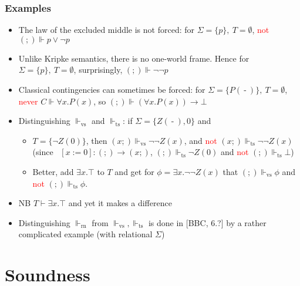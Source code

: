 \documentclass[handout,11pt]{beamer}
\newcommand{\red}[1]{\textcolor{red}{#1}}
\newcommand{\set}[1]{\{#1\}}
\newcommand{\es}{\emptyset}
\newcommand*{\subvs}{_{\mathrm{vs}}}
\newcommand*{\subrn}{_{\mathrm{rn}}}
\newcommand*{\subts}{_{\mathrm{ts}}}
\newcommand{\Fts}{\Vdash\subts}
\newcommand{\Fvs}{\Vdash\subvs}
\newcommand{\Frn}{\Vdash\subrn}
\newcommand{\blank}{\mathord{\operatorname{-}}} %
\begin{document}
\begin{frame}
\frametitle{Examples}
 \begin{itemize}[<+->]
    \item The law of the excluded middle is not forced:
    for $\Sigma=\set{p},~T=\es$, \red{not} $(;)\Vdash p\lor\neg p$
    \item Unlike Kripke semantics, there is no one-world frame. Hence
    for $\Sigma=\set{p},~T=\es$, surprisingly, $(;)\Vdash \neg\neg p$
    \item Classical contingencies can sometimes be forced:
    for $\Sigma=\set{P(\blank)},~T=\es$, \red{never} $C\Vdash \forall x. P(x)$,
    so $(;)\Vdash (\forall x. P(x))\to\bot$
    \item Distinguishing $\Fvs$ and $\Fts$: if $\Sigma=\set{Z(\blank),0}$ and
    \begin{itemize}[<+->]
     \item $T=\set{\neg Z(0)}$, then $(x;)\Fvs\neg\neg Z(x)$,
     and \red{not} $(x;)\Fts\neg\neg Z(x)$ (since  $[x:=0] : (;)\to(x;)$,
     $(;)\Fts \neg Z(0)$ and \red{not} $(;)\Fts \bot$)
     \item Better, add $\exists x.\top$ to $T$ and get for
     $\phi= \exists x.\neg\neg Z(x)$ that $(;)\Fvs \phi$ 
     and \red{not} $(;)\Fts\phi$.
    \end{itemize}
    \item NB $T\vdash\exists x.\top$ and yet it makes a difference
    \item Distinguishing $\Frn$ from $\Fvs,\Fts$ is done in [BBC, 6.?]
    by a rather complicated example (with relational $\Sigma$)
 \end{itemize}
\end{frame}

\section{Soundness}
\end{document}
